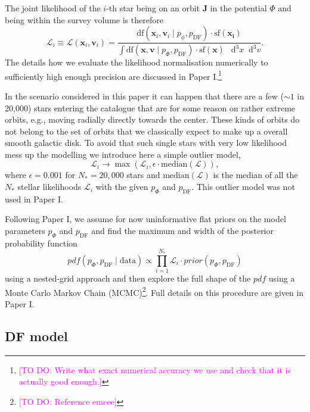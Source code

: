 \documentclass[iop,revtex4,numberedappendix,appendixfloats]{emulateapj}
\newcommand{\vect}[1]{\boldsymbol{#1}}
\newcommand*\Diff[1]{\mathop{}\!\mathrm{d^#1}}
\newcommand{\pdf}{\ensuremath{pdf}}
\newcommand{\Wilma}[1]{\textcolor{Magenta}{#1}}
\begin{document}
The joint likelihood of the $i$-th star being on an orbit $\vect{J}$ in the potential $\Phi$ and being within the survey volume is therefore
\begin{equation*}
\mathscr{L}_i \equiv \mathscr{L}(\vect{x}_i,\vect{v}_i) = \frac{\text{df}(\vect{x}_i,\vect{v}_i\mid p_\phi, p_\text{DF}) \cdot \text{sf}(\vect{x_i})}{\int \text{df}(\vect{x},\vect{v}\mid p_\Phi, p_\text{DF}) \cdot \text{sf}(\vect{x}) \ \Diff3 x \Diff3 v}.
\end{equation*}
The details how we evaluate the likelihood normalisation numerically to sufficiently high enough precision are discussed in Paper I.\footnote{\Wilma{[TO DO: Write what exact numerical accuracy we use and check that it is actually good enough.]}}

In the scenario considered in this paper it can happen that there are a few ($\sim 1$ in 20,000) stars entering the catalogue that are for some reason  on rather extreme orbits, e.g., moving radially directly towards the center. These kinds of orbits do not belong to the set of orbits that we classically expect to make up a overall smooth galactic disk. To avoid that such single stars with very low likelihood mess up the modelling we introduce here a simple outlier model,
\begin{equation*}
\mathscr{L}_i \longrightarrow \max \left( \mathscr{L}_i, \epsilon \cdot \text{median}(\mathscr{L})\right),
\end{equation*}
where $\epsilon = 0.001$ for $N_*=20,000$ stars and $\text{median}(\mathscr{L})$ is the median of all the $N_*$ stellar likelihoods $\mathscr{L}_i$ with the given $p_\Phi$ and $p_\text{DF}$. This outlier model was not used in Paper I.

Following Paper I, we assume for now uninformative flat priors on the model parameters $p_\Phi$ and $p_\text{DF}$ and find the maximum and width of the posterior probability function
\begin{equation*}
pdf(p_\Phi,p_\text{DF} \mid \text{data}) \propto \prod_{i=1}^{N_*} \mathscr{L}_i \cdot prior(p_\Phi,p_\text{DF})
\end{equation*}
using a nested-grid approach and then explore the full shape of the $\pdf$ using a Monte Carlo Markov Chain (MCMC)\footnote{\Wilma{[TO DO: Reference emcee]}}. Full details on this procedure are given in Paper I.

\subsection{ DF model}
\end{document}
